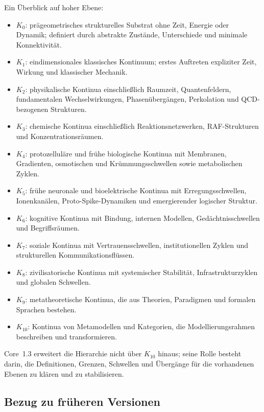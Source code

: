 Ein Überblick auf hoher Ebene:

\begin{itemize}
    \item \(K_0\): prägeometrisches strukturelles Substrat ohne Zeit, Energie oder Dynamik; definiert durch abstrakte Zustände, Unterschiede und minimale Konnektivität.
    \item \(K_1\): eindimensionales klassisches Kontinuum; erstes Auftreten expliziter Zeit, Wirkung und klassischer Mechanik.
    \item \(K_2\): physikalische Kontinua einschließlich Raumzeit, Quantenfeldern, fundamentalen Wechselwirkungen, Phasenübergängen, Perkolation und QCD-bezogenen Strukturen.
    \item \(K_3\): chemische Kontinua einschließlich Reaktionsnetzwerken, RAF-Strukturen und Konzentrationsräumen.
    \item \(K_4\): protozelluläre und frühe biologische Kontinua mit Membranen, Gradienten, osmotischen und Krümmungsschwellen sowie metabolischen Zyklen.
    \item \(K_5\): frühe neuronale und bioelektrische Kontinua mit Erregungsschwellen, Ionenkanälen, Proto-Spike-Dynamiken und emergierender logischer Struktur.
    \item \(K_6\): kognitive Kontinua mit Bindung, internen Modellen, Gedächtnisschwellen und Begriffsräumen.
    \item \(K_7\): soziale Kontinua mit Vertrauensschwellen, institutionellen Zyklen und strukturellen Kommunikationsflüssen.
    \item \(K_8\): zivilisatorische Kontinua mit systemischer Stabilität, Infrastrukturzyklen und globalen Schwellen.
    \item \(K_9\): metatheoretische Kontinua, die aus Theorien, Paradigmen und formalen Sprachen bestehen.
    \item \(K_{10}\): Kontinua von Metamodellen und Kategorien, die Modellierungsrahmen beschreiben und transformieren.
\end{itemize}

Core~1.3 erweitert die Hierarchie nicht über \(K_{10}\) hinaus; seine Rolle besteht darin, die Definitionen, Grenzen, Schwellen und Übergänge für die vorhandenen Ebenen zu klären und zu stabilisieren.

\subsection{Bezug zu früheren Versionen}

